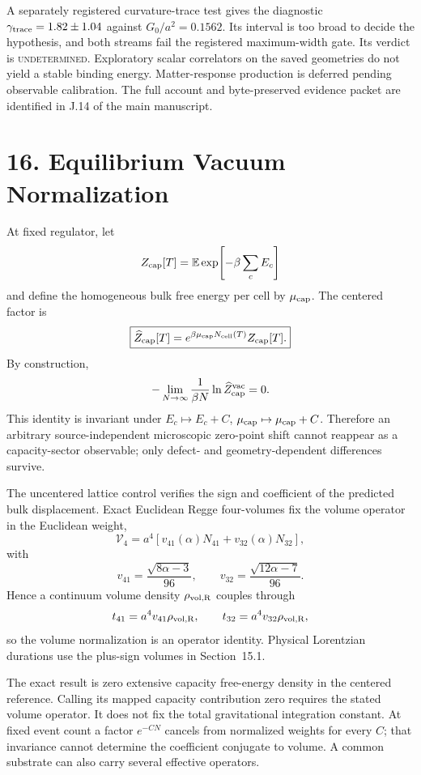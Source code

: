 \documentclass[11pt]{article}
\begin{document}
A separately registered curvature-trace test gives the diagnostic
$\gamma_{\rm trace}=1.82\pm1.04$ against $G_0/a^2=0.1562$.
Its interval is too broad to decide the hypothesis, and both streams
fail the registered maximum-width gate. Its verdict is
\textsc{undetermined}. Exploratory scalar correlators on the saved
geometries do not yield a stable binding energy. Matter-response
production is deferred pending observable calibration. The full
account and byte-preserved evidence packet are identified in J.14
of the main manuscript.

\section{16. Equilibrium Vacuum Normalization}

At fixed regulator, let
\[
Z_{\rm cap}[T]
=\mathbb E\exp\!\left[-\beta\sum_cE_c\right]
\]
and define the homogeneous bulk free energy per cell by $\mu_{\rm cap}$. The centered factor is
\[
\boxed{
\widehat Z_{\rm cap}[T]
=e^{\beta\mu_{\rm cap}N_{\rm cell}(T)}Z_{\rm cap}[T].
}
\]
By construction,
\[
-\lim_{N\to\infty}\frac1{\beta N}
\ln\widehat Z_{\rm cap}^{\rm vac}=0.
\]
This identity is invariant under $E_c\mapsto E_c+C$, $\mu_{\rm cap}\mapsto\mu_{\rm cap}+C$. Therefore an arbitrary source-independent microscopic zero-point shift cannot reappear as a capacity-sector observable; only defect- and geometry-dependent differences survive.

The uncentered lattice control verifies the sign and coefficient of the predicted bulk displacement. Exact Euclidean Regge four-volumes fix the volume operator in the Euclidean weight,
\[
\mathcal V_4
=a^4\left[v_{41}(\alpha)N_{41}+v_{32}(\alpha)N_{32}\right],
\]
with
\[
v_{41}=\frac{\sqrt{8\alpha-3}}{96},
\qquad
v_{32}=\frac{\sqrt{12\alpha-7}}{96}.
\]
Hence a continuum volume density $\rho_{\rm vol,R}$ couples through
\[
t_{41}=a^4v_{41}\rho_{\rm vol,R},
\qquad
t_{32}=a^4v_{32}\rho_{\rm vol,R},
\]
so the volume normalization is an operator identity. Physical Lorentzian durations use the plus-sign volumes in Section~15.1.

The exact result is zero extensive capacity free-energy density in the centered reference. Calling its mapped capacity contribution zero requires the stated volume operator. It does not fix the total gravitational integration constant. At fixed event count a factor $e^{-CN}$ cancels from normalized weights for every $C$; that invariance cannot determine the coefficient conjugate to volume. A common substrate can also carry several effective operators.
\end{document}
